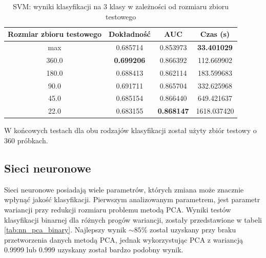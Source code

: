 \documentclass[a4paper, twoside, 11pt, openright]{article}
\begin{document}
\begin{table}[H]
    \centering
    \begin{tabular}{|c|c|c|c|}
    \hline
        \textbf{Rozmiar zbioru testowego} & \textbf{Dokładność} & \textbf{AUC} & \textbf{Czas (s)} \\ \hline
max                        &  0.685714 &  0.853973 &   \textbf{33.401029} \\ \hline
360.0                         &  \textbf{0.699206} &  0.866392 &   112.669902 \\ \hline
180.0                         &  0.688413 &  0.862114 &   183.599683 \\ \hline
90.0                          &  0.691711 &  0.865704 &   332.625968 \\ \hline
45.0                          &  0.685154 &  0.866440 &   649.421637 \\ \hline
22.0                          &  0.683155 &  \textbf{0.868147} &  1618.037420 \\ \hline
    \end{tabular}
    \caption{SVM: wyniki klasyfikacji na 3 klasy w zależności od rozmiaru zbioru testowego}
    \label{tab:svm_walk_forward_discrete}
\end{table}
    
W końcowych testach dla obu rodzajów klasyfikacji został użyty zbiór testowy o 360 próbkach.

\subsection{Sieci neuronowe}

Sieci neuronowe posiadają wiele parametrów, których zmiana może znacznie wpłynąć jakość klasyfikacji. Pierwszym analizowanym parametrem, jest parametr wariancji przy redukcji rozmiaru problemu metodą PCA. Wyniki testów klasyfikacji binarnej dla różnych progów wariancji, zostały przedstawione w tabeli \ref{tab:nn_pca_binary}.  Najlepszy wynik $\sim 85\%$ został uzyskany przy braku przetworzenia danych metodą PCA, jednak  wykorzystując PCA z wariancją 0.9999 lub 0.999 uzyskany został bardzo podobny wynik.
\end{document}
